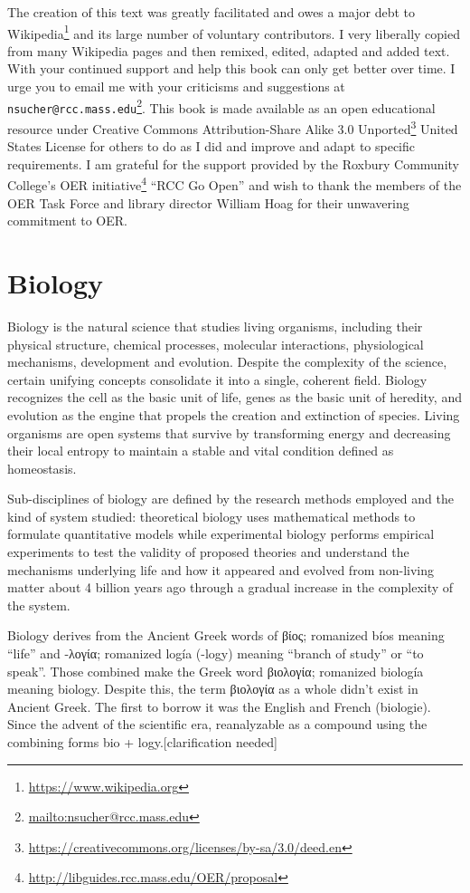 \documentclass[
]{book}
\renewcommand{\href}[2]{#2\footnote{\url{#1}}}
\begin{document}
The creation of this text was greatly facilitated and owes a major debt to \href{https://www.wikipedia.org}{Wikipedia} and its large number of voluntary contributors. I very liberally copied from many Wikipedia pages and then remixed, edited, adapted and added text. With your continued support and help this book can only get better over time. I urge you to email me with your criticisms and suggestions at \href{mailto:nsucher@rcc.mass.edu}{\nolinkurl{nsucher@rcc.mass.edu}}. This book is made available as an open educational resource under \href{https://creativecommons.org/licenses/by-sa/3.0/deed.en}{Creative Commons Attribution-Share Alike 3.0 Unported} United States License for others to do as I did and improve and adapt to specific requirements. I am grateful for the support provided by the \href{http://libguides.rcc.mass.edu/OER/proposal}{Roxbury Community College's OER initiative} ``RCC Go Open'' and wish to thank the members of the OER Task Force and library director William Hoag for their unwavering commitment to OER.

\hypertarget{biology}{%
\chapter{Biology}\label{biology}}

Biology is the natural science that studies living organisms, including their physical structure, chemical processes, molecular interactions, physiological mechanisms, development and evolution. Despite the complexity of the science, certain unifying concepts consolidate it into a single, coherent field. Biology recognizes the cell as the basic unit of life, genes as the basic unit of heredity, and evolution as the engine that propels the creation and extinction of species. Living organisms are open systems that survive by transforming energy and decreasing their local entropy to maintain a stable and vital condition defined as homeostasis.

Sub-disciplines of biology are defined by the research methods employed and the kind of system studied: theoretical biology uses mathematical methods to formulate quantitative models while experimental biology performs empirical experiments to test the validity of proposed theories and understand the mechanisms underlying life and how it appeared and evolved from non-living matter about 4 billion years ago through a gradual increase in the complexity of the system.

Biology derives from the Ancient Greek words of βίος; romanized bíos meaning ``life'' and -λογία; romanized logía (-logy) meaning ``branch of study'' or ``to speak''. Those combined make the Greek word βιολογία; romanized biología meaning biology. Despite this, the term βιολογία as a whole didn't exist in Ancient Greek. The first to borrow it was the English and French (biologie). Since the advent of the scientific era, reanalyzable as a compound using the combining forms bio + logy.{[}clarification needed{]}
\end{document}
